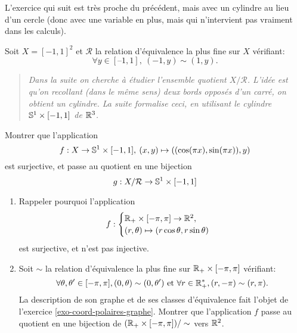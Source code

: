 L'exercice qui suit est très proche du précédent, mais avec un cylindre au lieu d'un cercle (donc avec une variable en plus, mais qui n'intervient pas vraiment dans les calculs).

\begin{exercice}
Soit $X=[-1,1]^2$ et $\mathcal R$ la relation d'équivalence la plus fine sur $X$ vérifiant:
\[ \forall y\in [–1,1], \: (-1,y)\sim (1,y).\]
\begin{quote}
\emph{Dans la suite on cherche à étudier l'ensemble quotient $X/\mathcal R$. L'idée est qu'on recollant (dans le même sens) deux bords opposés d'un carré, on obtient un cylindre. La suite formalise ceci, en utilisant le cylindre $\S^1\times [-1,1]$ de $\R^3$.}
\end{quote}
Montrer que l'application
\[ f : X \to \S^1\times [-1,1], \: (x,y) \mapsto ((\cos(\pi x), \sin(\pi x)), y)\]
est surjective, et passe au quotient en une bijection
\[ g : X/\mathcal R \to \S^1\times [-1,1]\]
\end{exercice}


\begin{exercice}
\begin{enumerate}
\item Rappeler pourquoi l'application
\[ f : \begin{cases}\R_+\times [-\pi,\pi] \to \R^2,\\  (r,\theta) \mapsto (r\cos\theta,r\sin\theta)\end{cases}\]
est surjective, et n'est pas injective.
\item Soit $\sim$ la relation d'équivalence la plus fine sur $\R_+\times [-\pi,\pi]$ vérifiant: 
\[
\forall \theta,\theta'\in [-\pi,\pi], (0,\theta)\sim (0,\theta')  \text{ et  } \forall r\in \R_+^*, (r,-\pi)\sim (r,\pi).
\]
La description de son graphe et de ses classes d'équivalence fait l'objet de l'exercice \ref{exo-coord-polaires-graphe}. Montrer que l'application $f$ passe au quotient en une bijection  de $(\R_+\times [-\pi,\pi]) / \sim$ vers $\R^2$.
\end{enumerate}
\end{exercice}



